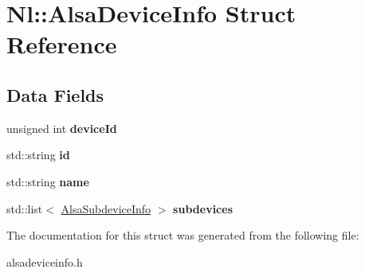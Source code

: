 \hypertarget{structNl_1_1AlsaDeviceInfo}{\section{Nl\-:\-:Alsa\-Device\-Info Struct Reference}
\label{structNl_1_1AlsaDeviceInfo}
}
\subsection*{Data Fields}
\begin{DoxyCompactItemize}
\item 
\hypertarget{structNl_1_1AlsaDeviceInfo_a4fbdac0b6662041161001d92efa0a4bb}{unsigned int {\bfseries device\-Id}}\label{structNl_1_1AlsaDeviceInfo_a4fbdac0b6662041161001d92efa0a4bb}

\item 
\hypertarget{structNl_1_1AlsaDeviceInfo_a254cf1c259f8c2c871b02d8bc9348b59}{std\-::string {\bfseries id}}\label{structNl_1_1AlsaDeviceInfo_a254cf1c259f8c2c871b02d8bc9348b59}

\item 
\hypertarget{structNl_1_1AlsaDeviceInfo_a2ee8fd63c9d70d854f10345358fdbcdc}{std\-::string {\bfseries name}}\label{structNl_1_1AlsaDeviceInfo_a2ee8fd63c9d70d854f10345358fdbcdc}

\item 
\hypertarget{structNl_1_1AlsaDeviceInfo_a5836721ffb1d4d46e00625c69cbdba95}{std\-::list$<$ \hyperlink{structNl_1_1AlsaSubdeviceInfo}{Alsa\-Subdevice\-Info} $>$ {\bfseries subdevices}}\label{structNl_1_1AlsaDeviceInfo_a5836721ffb1d4d46e00625c69cbdba95}

\end{DoxyCompactItemize}


The documentation for this struct was generated from the following file\-:\begin{DoxyCompactItemize}
\item 
alsadeviceinfo.\-h\end{DoxyCompactItemize}
